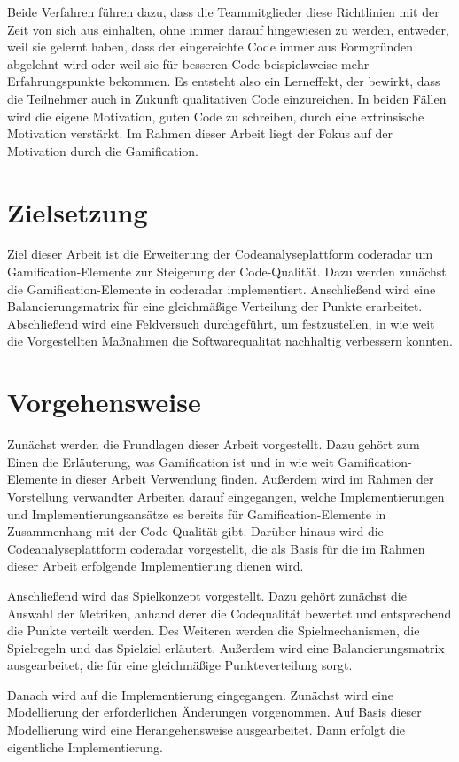 \documentclass[fontsize=11pt, paper=a4, parskip=half]{scrartcl}
\begin{document}
Beide Verfahren führen dazu, dass die Teammitglieder diese Richtlinien mit der Zeit von sich aus einhalten, ohne immer darauf hingewiesen zu werden, entweder, weil sie gelernt haben, dass der eingereichte Code immer aus Formgründen abgelehnt wird oder weil sie für besseren Code beispielsweise mehr Erfahrungspunkte bekommen.
Es entsteht also ein Lerneffekt, der bewirkt, dass die Teilnehmer auch in Zukunft qualitativen Code einzureichen.
In beiden Fällen wird die eigene Motivation, guten Code zu schreiben, durch eine extrinsische Motivation verstärkt.
Im Rahmen dieser Arbeit liegt der Fokus auf der Motivation durch die Gamification.


\section{Zielsetzung}
Ziel dieser Arbeit ist die Erweiterung der Codeanalyseplattform coderadar um Gamification-Elemente zur Steigerung der Code-Qualität.
Dazu werden zunächst die Gamification-Elemente in coderadar implementiert.
Anschließend wird eine Balancierungsmatrix für eine gleichmäßige Verteilung der Punkte erarbeitet.
Abschließend wird eine Feldversuch durchgeführt, um festzustellen, in wie weit die Vorgestellten Maßnahmen die Softwarequalität nachhaltig verbessern konnten.

\section{Vorgehensweise}
Zunächst werden die Frundlagen dieser Arbeit vorgestellt.
Dazu gehört zum Einen die Erläuterung, was Gamification ist und in wie weit Gamification-Elemente in dieser Arbeit Verwendung finden.
Außerdem wird im Rahmen der Vorstellung verwandter Arbeiten darauf eingegangen, welche Implementierungen und Implementierungsansätze es bereits für Gamification-Elemente in Zusammenhang mit der Code-Qualität gibt.
Darüber hinaus wird die Codeanalyseplattform coderadar vorgestellt, die als Basis für die im Rahmen dieser Arbeit erfolgende Implementierung dienen wird.

Anschließend wird das Spielkonzept vorgestellt.
Dazu gehört zunächst die Auswahl der Metriken, anhand derer die Codequalität bewertet und entsprechend die Punkte verteilt werden.
Des Weiteren werden die Spielmechanismen, die Spielregeln und das Spielziel erläutert.
Außerdem wird eine Balancierungsmatrix ausgearbeitet, die für eine gleichmäßige Punkteverteilung sorgt.

Danach wird auf die Implementierung eingegangen.
Zunächst wird eine Modellierung der erforderlichen Änderungen vorgenommen.
Auf Basis dieser Modellierung wird eine Herangehensweise ausgearbeitet.
Dann erfolgt die eigentliche Implementierung.
\end{document}

